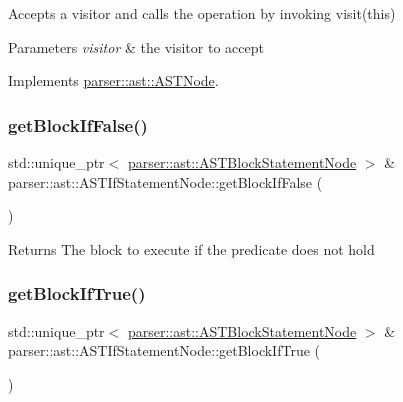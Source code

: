 Accepts a visitor and calls the operation by invoking {\ttfamily visit(this)} 
\begin{DoxyParams}{Parameters}
{\em visitor} & the visitor to accept \\
\hline
\end{DoxyParams}


Implements \hyperlink{classparser_1_1ast_1_1ASTNode_a3ff84fdfdbbc5c39b70b4d04c22e7dc3}{parser\+::ast\+::\+A\+S\+T\+Node}.

\mbox{\label{classparser_1_1ast_1_1ASTIfStatementNode_a1f66f144fdb82bff3ead69fd563bcf73}} 
\subsubsection{\texorpdfstring{get\+Block\+If\+False()}{getBlockIfFalse()}}
{\footnotesize\ttfamily std\+::unique\+\_\+ptr$<$ \hyperlink{classparser_1_1ast_1_1ASTBlockStatementNode}{parser\+::ast\+::\+A\+S\+T\+Block\+Statement\+Node} $>$ \& parser\+::ast\+::\+A\+S\+T\+If\+Statement\+Node\+::get\+Block\+If\+False (\begin{DoxyParamCaption}{ }\end{DoxyParamCaption})}

\begin{DoxyReturn}{Returns}
The block to execute if the predicate does not hold 
\end{DoxyReturn}
\mbox{\label{classparser_1_1ast_1_1ASTIfStatementNode_a2db9e09e077f5fbb99c101ee0bf02887}} 
\subsubsection{\texorpdfstring{get\+Block\+If\+True()}{getBlockIfTrue()}}
{\footnotesize\ttfamily std\+::unique\+\_\+ptr$<$ \hyperlink{classparser_1_1ast_1_1ASTBlockStatementNode}{parser\+::ast\+::\+A\+S\+T\+Block\+Statement\+Node} $>$ \& parser\+::ast\+::\+A\+S\+T\+If\+Statement\+Node\+::get\+Block\+If\+True (\begin{DoxyParamCaption}{ }\end{DoxyParamCaption})}

